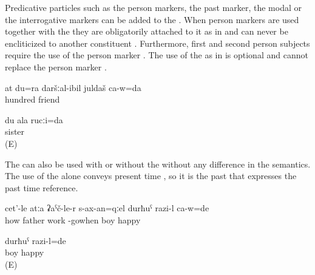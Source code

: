 Predicative particles such as the person markers, the past marker, the modal  or the interrogative markers can be added to the  . When person markers are used together with the  they are obligatorily attached to it as in  and can never be encliticized to another constituent . Furthermore, first and second person subjects require the use of the person marker . The use of the  as in  is optional and cannot replace the person marker .
%
\begin{exe}
	\ex	\label{ex:‎‎I am your 100th friend}
	\gll	at	du=ra	daršːal-ibil	juldaš	ca-w=da\\
				hundred	friend	\\
	\glt	{}



	\ex	\label{ex:ungrammaticalIamyoursisterA_1}
	\gll	du ala rucːi=da \\
				sister	\\
	\glt	{} (E)
	
	
\end{exe}

The   can also be used with  or without the   without any difference in the semantics. The use of the  alone conveys present time , so it is the past  that expresses the past time reference. 
%
\begin{exe}
	\ex	\label{ex:‎When the father came back from work, the boy was happy}
	\gll	cet'-le	atːa	ʡaˁč-le-r	s-ax-an=qːel	durħuˁ	razi-l	ca-w=de\\
		how	father	work	-gowhen	boy	happy	\\
	\glt	{}

	\ex	\label{ex:The boy was happy.COP}
	\gll	durħuˁ	razi-l=de\\
		boy	happy\\
	\glt	{} (E)
\end{exe}

